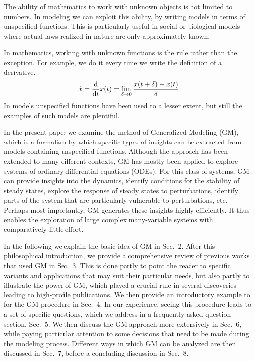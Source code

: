 \documentclass{article}
\begin{document}
The ability of mathematics to work with unknown objects is not limited to numbers. In modeling we can exploit this ability, by writing models in terms of unspecified functions.
This is particularly useful in social or biological models where actual laws realized in nature are only approximately known.

In mathematics, working with unknown functions is the rule rather than the exception. For example, we do it every time we write the definition of a derivative. 
\begin{equation}
\dot{x}=\frac{{\rm d}}{{\rm d} t} x(t) = \lim_{\delta\to 0} \frac{x(t+\delta)-x(t)}{\delta}
\end{equation}
In models unspecified functions have been used to a lesser extent, but still the examples of such models are plentiful. 

In the present paper we examine the method of Generalized Modeling (GM), which is a formalism by which specific types of 
insights can be extracted from models containing unspecified functions. Although the approach has been extended to many different contexts, GM has mostly been applied to explore systems of ordinary differential equations (ODEs). For this class of systems, GM can provide insights into the dynamics, identify conditions for the stability of steady states, 
explore the response of steady states to perturbations, identify parts of the system that are particularly vulnerable to perturbations, etc.
Perhaps most importantly, GM generates these insights highly efficiently. It thus enables the
exploration of large complex many-variable systems with comparatively little effort.

In the following we explain the basic idea of GM in Sec.~2. After this philosophical introduction, we provide a comprehensive review 
of previous works that used GM in Sec.~3. This is done partly to point the reader to specific variants and applications that may suit their particular needs, but also partly to illustrate the power of GM, which played a crucial rule in several discoveries leading to high-profile publications. We then provide an introductory example to for the GM procedure in Sec.~4. In our experience, seeing this procedure leads to a set of specific questions, which we address in a frequently-asked-question section, Sec.~5. We then discuss the GM approach more extensively in Sec.~6, while paying particular attention to some decisions that need to be made during the modeling process. Different ways in which GM can be analyzed are then discussed in Sec.~7, before a concluding discussion in Sec.~8. 
\end{document}
